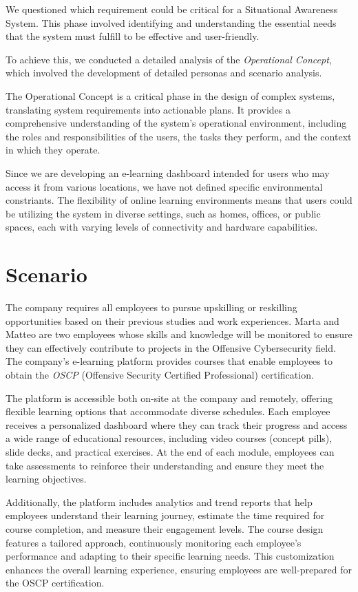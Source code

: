 We questioned which requirement could be critical for a Situational Awareness System. This phase involved identifying and understanding the essential needs that the system must fulfill to be effective and user-friendly. 

To achieve this, we conducted a detailed analysis of the \textit{Operational Concept}, which involved the development of detailed personas and scenario analysis. 

The Operational Concept is a critical phase in the design of complex systems, translating system requirements into actionable plans. 
It provides a comprehensive understanding of the system's operational environment, including the roles and responsibilities of the users, the tasks they perform, and the context in which they operate.

Since we are developing an e-learning dashboard intended for users who may access it from various locations, we have not defined specific environmental constriants. The flexibility of online learning environments means that users could be utilizing the system in diverse settings, such as homes, offices, or public spaces, each with varying levels of connectivity and hardware capabilities.

\section{Scenario}
The company requires all employees to pursue upskilling or reskilling opportunities based on their previous studies and work experiences. Marta and Matteo are two employees whose skills and knowledge will be monitored to ensure they can effectively contribute to projects in the Offensive Cybersecurity field. The company’s e-learning platform provides courses that enable employees to obtain the \textit{OSCP} (Offensive Security Certified Professional) certification.

The platform is accessible both on-site at the company and remotely, offering flexible learning options that accommodate diverse schedules. Each employee receives a personalized dashboard where they can track their progress and access a wide range of educational resources, including video courses (concept pills), slide decks, and practical exercises. At the end of each module, employees can take assessments to reinforce their understanding and ensure they meet the learning objectives.

Additionally, the platform includes analytics and trend reports that help employees understand their learning journey, estimate the time required for course completion, and measure their engagement levels. The course design features a tailored approach, continuously monitoring each employee’s performance and adapting to their specific learning needs. This customization enhances the overall learning experience, ensuring employees are well-prepared for the OSCP certification.

